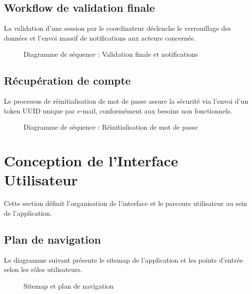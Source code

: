 \documentclass[12pt,a4paper]{article}
\begin{document}
\subsection{Workflow de validation finale}
La validation d'une session par le coordinateur déclenche le verrouillage des données et l'envoi massif de notifications aux acteurs concernés.

\begin{figure}[H]
    \centering
    \caption{Diagramme de séquence : Validation finale et notifications}
\end{figure}

\subsection{Récupération de compte}
Le processus de réinitialisation de mot de passe assure la sécurité via l'envoi d'un token UUID unique par e-mail, conformément aux besoins non fonctionnels.

\begin{figure}[H]
    \centering
    \caption{Diagramme de séquence : Réinitialisation de mot de passe}
\end{figure}

\newpage
\section{Conception de l'Interface Utilisateur}
\label{sec:ihm}

Cette section définit l'organisation de l'interface et le parcours utilisateur au sein de l'application.

\subsection{Plan de navigation}
Le diagramme suivant présente le sitemap de l'application et les points d'entrée selon les rôles utilisateurs.

\begin{figure}[H]
    \centering
    \caption{Sitemap et plan de navigation}
\end{figure}
\end{document}

